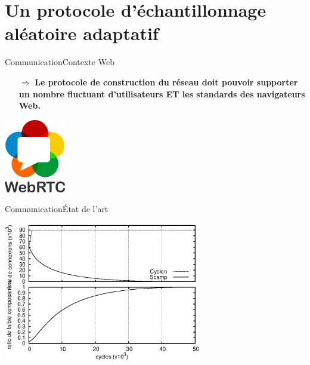 \section{Un protocole d'échantillonnage aléatoire adaptatif}

\begin{frame}{Communication}{Contexte Web}

  \large
  \begin{itemize}
  \item [$\Rightarrow$] \textbf{Le protocole de construction du réseau doit
      pouvoir supporter un nombre fluctuant d'utilisateurs ET les standards des
      navigateurs Web.}
  \end{itemize}

  \vspace{1cm}

  \begin{center}
    \includegraphics[width=0.2\textwidth]{img/webrtc.png}
  \end{center}

\end{frame}


\begin{frame}{Communication}{État de l'art}

  \begin{center}
    \begin{table}[H]
      
    \end{table}
  \end{center}
  \begin{center}
    \includegraphics[width=0.65\textwidth]{img/network/motivation.eps}
  \end{center}

\end{frame}



